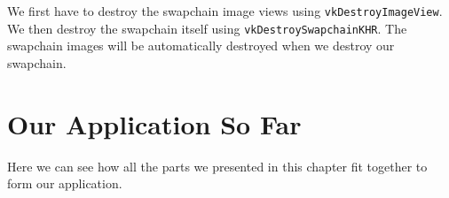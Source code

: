 We first have to destroy the swapchain image views using \texttt{vkDestroyImageView}.
We then destroy the swapchain itself using \texttt{vkDestroySwapchainKHR}.
The swapchain images will be automatically destroyed when we destroy our
swapchain.

\section{Our Application So Far}

Here we can see how all the parts we presented in this chapter fit together
to form our application.

\begin{minipage}{\linewidth}{\noindent}
    
\end{minipage}

